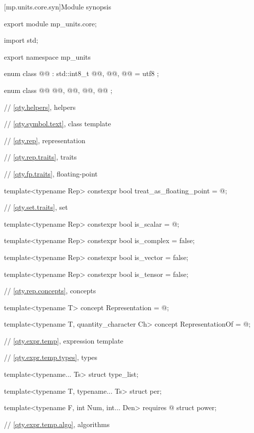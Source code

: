 [mp.units.core.syn]{Module  synopsis}
%
\begin{codeblock}
export module mp_units.core;

import std;

export namespace mp_units {

enum class @@ : std::int8_t { @@, @@, @@ = utf8 };

enum class @@ { @@, @@, @@, @@ };

// \ref{qty.helpers}, helpers

// \ref{qty.symbol.text}, class template 

// \ref{qty.rep}, representation

// \ref{qty.rep.traits}, traits

// \ref{qty.fp.traits}, floating-point

template<typename Rep>
constexpr bool treat_as_floating_point = @\seebelownc@;

// \ref{qty.set.traits}, set

template<typename Rep>
constexpr bool is_scalar = @\seebelownc@;

template<typename Rep>
constexpr bool is_complex = false;

template<typename Rep>
constexpr bool is_vector = false;

template<typename Rep>
constexpr bool is_tensor = false;

// \ref{qty.rep.concepts}, concepts

template<typename T>
concept Representation = @\seebelownc@;

template<typename T, quantity_character Ch>
concept RepresentationOf = @\seebelownc@;

// \ref{qty.expr.temp}, expression template

// \ref{qty.expr.temp.types}, types

template<typename... Ts>
struct type_list;

template<typename T, typename... Ts>
struct per;

template<typename F, int Num, int... Den>
  requires @\seebelownc@
struct power;

// \ref{qty.expr.temp.algo}, algorithms

}
\end{codeblock}
